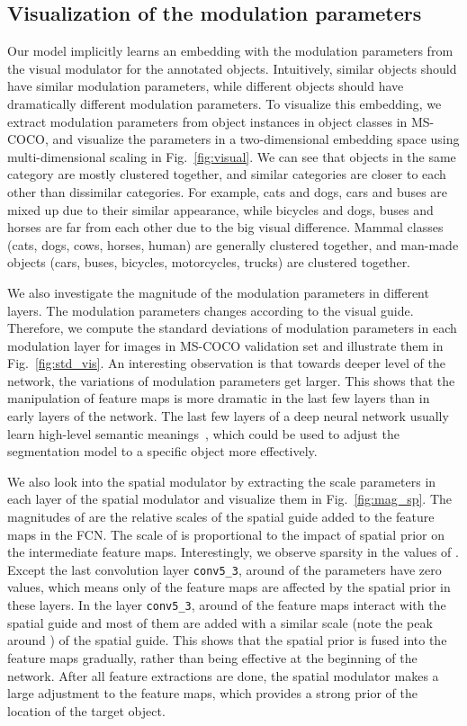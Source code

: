 \documentclass[10pt,twocolumn,letterpaper]{article}
\begin{document}
\subsection{Visualization of the modulation parameters}\label{sec:rep}
Our model implicitly learns an embedding with the modulation parameters from the visual modulator for the annotated objects. Intuitively, similar objects should have similar modulation parameters, while different objects should have dramatically different modulation parameters. To visualize this embedding, we extract modulation parameters from  object instances in  object classes in MS-COCO, and visualize the parameters in a two-dimensional embedding space using multi-dimensional scaling in Fig.~\ref{fig:visual}. We can see that objects in the same category are mostly clustered together, and similar categories are closer to each other than dissimilar categories. For example, cats and dogs, cars and buses are mixed up due to their similar appearance, while bicycles and dogs, buses and horses are far from each other due to the big visual difference. Mammal classes (cats, dogs, cows, horses, human) are generally clustered together, and man-made objects (cars, buses, bicycles, motorcycles, trucks) are clustered together. 

We also investigate the magnitude of the modulation parameters in different layers. The modulation parameters  changes according to the visual guide. Therefore, we compute the standard deviations of modulation parameters  in each modulation layer for images in MS-COCO validation set and illustrate them in Fig.~\ref{fig:std_vis}. An interesting observation is that towards deeper level of the network, the variations of modulation parameters get larger. This shows that the manipulation of feature maps is more dramatic in the last few layers than in early layers of the network. The last few layers of a deep neural network usually learn high-level semantic meanings~\cite{Zeiler2014visualizing}, which could be used to adjust the segmentation model to a specific object more effectively.

We also look into the spatial modulator by extracting the scale parameters  in each layer of the spatial modulator and visualize them in Fig.~\ref{fig:mag_sp}. The magnitudes of  are the relative scales of the spatial guide added to the feature maps in the FCN. The scale of  is proportional to the impact of spatial prior on the intermediate feature maps. Interestingly, we observe sparsity in the values of . Except the last convolution layer \texttt{conv5\_3}, around  of the parameters have zero values, which means only  of the feature maps are affected by the spatial prior in these layers. In the layer \texttt{conv5\_3}, around  of the feature maps interact with the spatial guide and most of them are added with a similar scale (note the peak around ) of the spatial guide. This shows that the spatial prior is fused into the feature maps gradually, rather than being effective at the beginning of the network. After all feature extractions are done, the spatial modulator makes a large adjustment to the feature maps, which provides a strong prior of the location of the target object.
\end{document}
